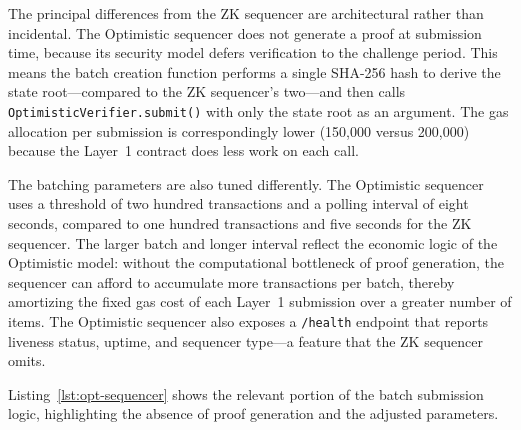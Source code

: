 The principal differences from the ZK sequencer are architectural rather than incidental. The Optimistic sequencer does not generate a proof at submission time, because its security model defers verification to the challenge period. This means the batch creation function performs a single SHA-256 hash to derive the state root---compared to the ZK sequencer's two---and then calls \texttt{OptimisticVerifier.submit()} with only the state root as an argument. The gas allocation per submission is correspondingly lower (150,000 versus 200,000) because the Layer~1 contract does less work on each call.

The batching parameters are also tuned differently. The Optimistic sequencer uses a threshold of two hundred transactions and a polling interval of eight seconds, compared to one hundred transactions and five seconds for the ZK sequencer. The larger batch and longer interval reflect the economic logic of the Optimistic model: without the computational bottleneck of proof generation, the sequencer can afford to accumulate more transactions per batch, thereby amortizing the fixed gas cost of each Layer~1 submission over a greater number of items. The Optimistic sequencer also exposes a \texttt{/health} endpoint that reports liveness status, uptime, and sequencer type---a feature that the ZK sequencer omits.

Listing~\ref{lst:opt-sequencer} shows the relevant portion of the batch submission logic, highlighting the absence of proof generation and the adjusted parameters.

